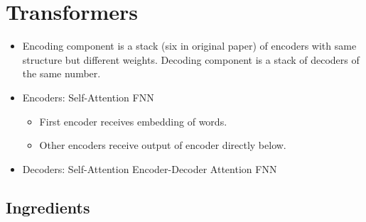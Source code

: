 \documentclass[../ds]{subfiles}
\begin{document}
\section{Transformers}
\begin{itemize}
\item 
Encoding component is a stack (six in original paper) of encoders with same structure but different weights. Decoding component is a stack of decoders of the same number.

\item 
Encoders: Self-Attention \textrightarrow{} FNN
	\begin{itemize}
	\item 
	First encoder receives embedding of words.
	
	\item 
	Other encoders receive output of encoder directly below.
	\end{itemize}

\item 
Decoders: Self-Attention \textrightarrow{} Encoder-Decoder Attention \textrightarrow{} FNN
\end{itemize}

\subsection{Ingredients}
\end{document}
